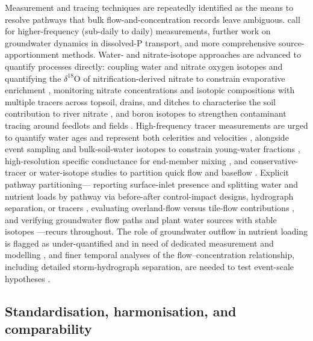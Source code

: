 \documentclass[11pt]{article}
\begin{document}
Measurement and tracing techniques are repeatedly identified as the means
to resolve pathways that bulk flow-and-concentration records leave
ambiguous. \textcite{Williams2022} call for higher-frequency (sub-daily to
daily) measurements, further work on groundwater dynamics in dissolved-P
transport, and more comprehensive source-apportionment methods.
Water- and nitrate-isotope approaches are advanced to quantify processes
directly: coupling water and nitrate oxygen isotopes and quantifying the
$\delta^{18}$O of nitrification-derived nitrate to constrain evaporative
enrichment \parencite{Hu2024}, monitoring nitrate concentrations and
isotopic compositions with multiple tracers across topsoil, drains, and
ditches to characterise the soil contribution to river nitrate
\parencite{Briand2017}, and boron isotopes to strengthen contaminant
tracing around feedlots and fields \parencite{Komor1997}. High-frequency
tracer measurements are urged to quantify water ages and represent both
celerities and velocities \parencite{Williams2021}, alongside event
sampling and bulk-soil-water isotopes to constrain young-water fractions
\parencite{DimitrovaPetrova2020}, high-resolution specific conductance for
end-member mixing \parencite{Kronholm2015,Schilling2019}, and
conservative-tracer or water-isotope studies to partition quick flow and
baseflow \parencite{Frederiksen2023}. Explicit pathway partitioning---
reporting surface-inlet presence and splitting water and nutrient loads by
pathway via before-after control-impact designs, hydrograph separation, or
tracers \parencite{Flores2021}, evaluating overland-flow versus tile-flow
contributions \parencite{Kokulan2019}, and verifying groundwater flow paths
and plant water sources with stable isotopes
\parencite{Islam2022,YliHalla2022}---recurs throughout. The role of
groundwater outflow in nutrient loading is flagged as under-quantified and
in need of dedicated measurement and modelling
\parencite{Turunen2013,Jokinen2024,Barkle2021}, and finer temporal analyses
of the flow--concentration relationship, including detailed storm-hydrograph
separation, are needed to test event-scale hypotheses
\parencite{Lagzdins2015,Danalatos2022,Kladivko2004}.

\subsection{Standardisation, harmonisation, and comparability}
\end{document}
